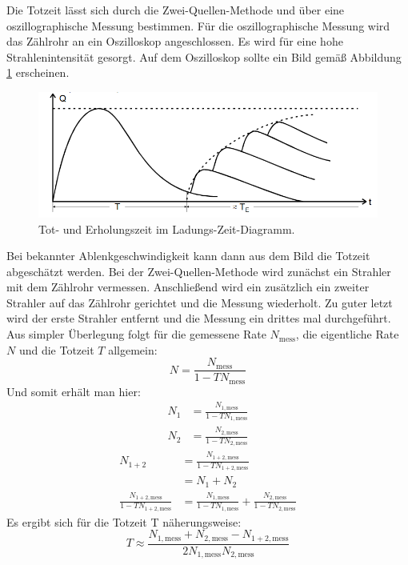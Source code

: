 Die Totzeit lässt sich durch die Zwei-Quellen-Methode und über eine oszillographische Messung bestimmen.
Für die oszillographische Messung wird das Zählrohr an ein Oszilloskop angeschlossen.
Es wird für eine hohe Strahlenintensität gesorgt.
Auf dem Oszilloskop sollte ein Bild gemäß Abbildung \ref{fig:osz} erscheinen.
\begin{figure}[H]
  \centering
  \includegraphics[width=\textwidth]{content/Totzeit.png}
  \caption{Tot- und Erholungszeit im Ladungs-Zeit-Diagramm.\cite{v703}}
  \label{fig:osz}
\end{figure}

Bei bekannter Ablenkgeschwindigkeit kann dann aus dem Bild die Totzeit abgeschätzt werden.
Bei der Zwei-Quellen-Methode wird zunächst ein Strahler mit dem Zählrohr vermessen. Anschließend wird ein zusätzlich ein zweiter Strahler
auf das Zählrohr gerichtet und die Messung wiederholt.
Zu guter letzt wird der erste Strahler entfernt und die Messung ein drittes mal durchgeführt.
Aus simpler Überlegung folgt für die gemessene Rate $N_\text{mess}$, die eigentliche Rate $N$ und die Totzeit $T$ allgemein:
\begin{equation}
    N = \frac{N_\text{mess}}{1-TN_\text{mess}}
\end{equation}
Und somit erhält man hier:
\begin{align}
    N_1     &= \frac{N_{1,\text{mess}}}{1-TN_{1,\text{mess}}} \\
    N_2     &= \frac{N_{2,\text{mess}}}{1-TN_{2,\text{mess}}}
\end{align}
\begin{align}
    N_{1+2} &= \frac{N_{1+2,\text{mess}}}{1-TN_{1+2,\text{mess}}} \\
            &= N_1 + N_2 \\
    \frac{N_{1+2,\text{mess}}}{1-TN_{1+2,\text{mess}}} &=\frac{N_{1,\text{mess}}}{1-TN_{1,\text{mess}}} + \frac{N_{2,\text{mess}}}{1-TN_{2,\text{mess}}}
\end{align}
Es ergibt sich für die Totzeit T näherungsweise:
\begin{equation}
    \label{eqn:totzeit}
    T \approx \frac{N_{1,\text{mess}} + N_{2,\text{mess}} - N_{1+2,\text{mess}}}{2N_{1,\text{mess}}N_{2,\text{mess}}}
\end{equation}

